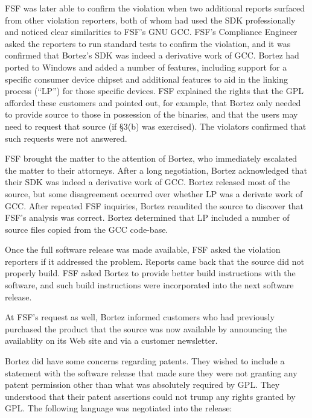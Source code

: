 {FSF was later able to confirm the violation when two additional reports
surfaced from other violation reporters, both of whom had used the SDK
professionally and noticed clear similarities to FSF's GNU GCC\@. FSF's
Compliance Engineer asked the reporters to run standard tests to confirm
the violation, and it was confirmed that Bortez's SDK was indeed a
derivative work of GCC\@. Bortez had ported to Windows and added a number
of features, including support for a specific consumer device chipset and
additional features to aid in the linking process (``LP'') for those
specific devices. FSF explained the rights that the GPL afforded these
customers and pointed out, for example, that Bortez only needed to provide
source to those in possession of the binaries, and that the users may need
to request that source (if \S 3(b) was exercised). The violators
confirmed that such requests were not answered.

FSF brought the matter to the attention of Bortez, who immediately
escalated the matter to their attorneys. After a long negotiation,
Bortez acknowledged that their SDK was indeed a derivative work of
GCC\@. Bortez released most of the source, but some disagreement
occurred over whether LP was a derivate work of GCC\@. After repeated
FSF inquiries, Bortez reaudited the source to discover that FSF's
analysis was correct. Bortez determined that LP included a number of
source files copied from the GCC code-base.

\label{davrik-build-problems}
Once the full software release was made available, FSF asked the violation
reporters if it addressed the problem. Reports came back that the source
did not properly build. FSF asked Bortez to provide better build
instructions with the software, and such build instructions were
incorporated into the next software release.

At FSF's request as well, Bortez informed customers who had previously
purchased the product that the source was now available by announcing
the availablity on its Web site and via a customer newsletter.

Bortez did have some concerns regarding patents. They wished to include a
statement with the software release that made sure they were not granting
any patent permission other than what was absolutely required by GPL\@.
They understood that their patent assertions could not trump any rights
granted by GPL\@. The following language was negotiated into the release:

}
